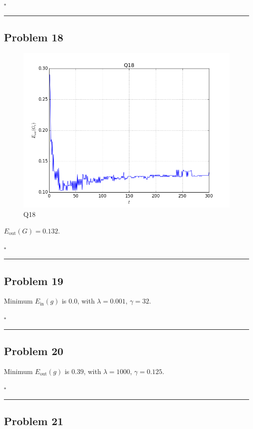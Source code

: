 \documentclass[12pt]{article}
\newcommand*{\QEDB}{\hfill\ensuremath{\square}}
\newcommand{\ParTh}[1]{\left(#1\right)}
\newcommand{\horrule}[1]{\rule{\linewidth}{#1}}
\begin{document}
\QEDB

\horrule{0.5pt}

\subsection*{Problem 18}

\begin{figure}[H]
	\centering
	\includegraphics[scale=0.5]{Q18.png}
	\caption{Q18}
	\label{Q18}
\end{figure}
$E_{\text{out}}\ParTh{G}=0.132$.

\QEDB

\horrule{0.5pt}

\subsection*{Problem 19}

Minimum $E_{\text{in}}\ParTh{g}$ is $0.0$, with $\lambda = 0.001$, $\gamma = 32$.

\QEDB

\horrule{0.5pt}

\subsection*{Problem 20}

Minimum $E_{\text{out}}\ParTh{g}$ is $0.39$, with $\lambda = 1000$, $\gamma = 0.125$.

\QEDB

\horrule{0.5pt}

\subsection*{Problem 21}
\end{document}
